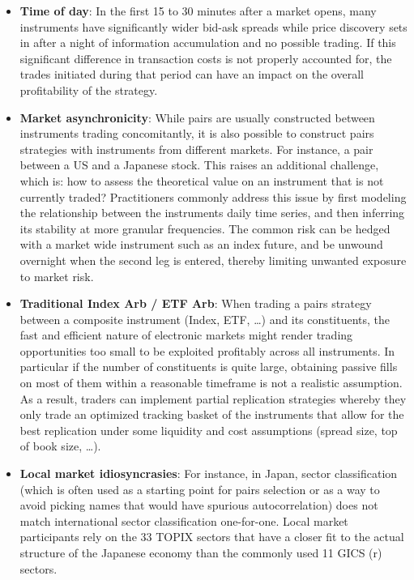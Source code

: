 \begin{itemize}
\item \textbf{Time of day}: In the first 15 to 30 minutes after a market opens, many instruments have significantly wider bid-ask spreads while price discovery sets in after a night of information accumulation and no possible trading. If this significant difference in transaction costs is not properly accounted for, the trades initiated during that period can have an impact on the overall profitability of the strategy.

\item \textbf{Market asynchronicity}: While pairs are usually constructed between instruments trading concomitantly, it is also possible to construct pairs strategies with instruments from different markets. For instance, a pair between a US and a Japanese stock. This raises an additional challenge, which is: how to assess the theoretical value on an instrument that is not currently traded? Practitioners commonly address this issue by first modeling the relationship between the instruments daily time series, and then inferring its stability at more granular frequencies. The common risk can be hedged with a market wide instrument such as an index future, and be unwound overnight when the second leg is entered, thereby limiting unwanted exposure to market risk.

\item \textbf{Traditional Index Arb / ETF Arb}: When trading a pairs strategy between a composite instrument (Index, ETF, \dots) and its constituents, the fast and efficient nature of electronic markets might render trading opportunities too small to be exploited profitably across all instruments. In particular if the number of constituents is quite large, obtaining passive fills on most of them within a reasonable timeframe is not a realistic assumption. As a result, traders can implement partial replication strategies whereby they only trade an optimized tracking basket of the instruments that allow for the best replication under some liquidity and cost assumptions (spread size, top of book size, \dots). 

\item \textbf{Local market idiosyncrasies}: For instance, in Japan, sector classification (which is often used as a starting point for pairs selection or as a way to avoid picking names that would have spurious autocorrelation) does not match international sector classification one-for-one. Local market participants rely on the 33 TOPIX sectors that have a closer fit to the actual structure of the Japanese economy than the commonly used 11 GICS (r) sectors.


\end{itemize}
